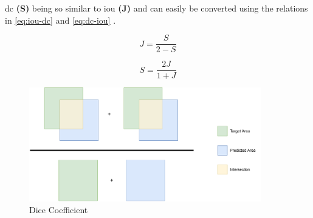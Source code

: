 \acrlong{dc} \textbf{(S)} being so similar to \acrlong{iou} \textbf{(J)} and can easily be converted using the relations in \autoref{eq:iou-dc} and \autoref{eq:dc-iou} \cite{wiki_dc}.

\begin{minipage}{.45\linewidth}
\begin{equation}\label{eq:iou-dc}
    J = \frac{S}{2 - S}
\end{equation}
\end{minipage}
\begin{minipage}{.45\linewidth}
\begin{equation}\label{eq:dc-iou}
    S = \frac{2J}{1 + J}
\end{equation}
\end{minipage}

\begin{figure}[H]
  \centering
  \includegraphics[width=0.9\textwidth]{img/objective_measures/dc.pdf}
  \caption{Dice Coefficient}
  \label{fig:dc}
\end{figure}